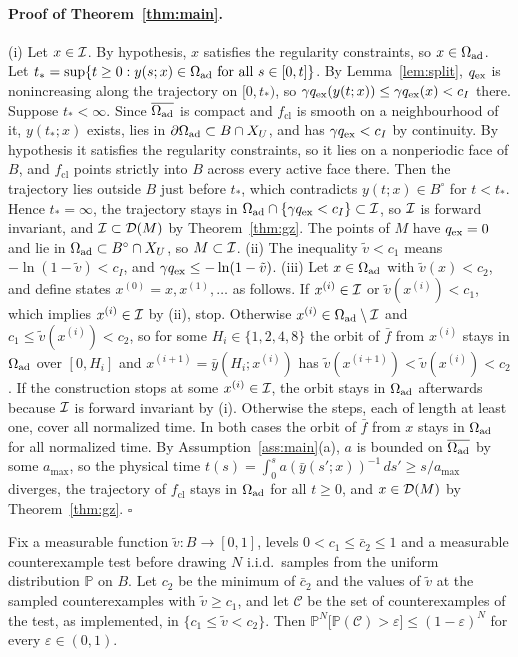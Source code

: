 \paragraph{Proof of Theorem~\ref{thm:main}.} (i) Let $x\in\mathcal I$. By hypothesis, $x$ satisfies the regularity constraints, so $x\in\Omega_{\mathrm{ad}}$. Let $t_*=\sup\{t\ge0:y(s;x)\in\Omega_{\mathrm{ad}}\text{ for all }s\in[0,t]\}$. By Lemma~\ref{lem:split}, $q_{\mathrm{ex}}$ is nonincreasing along the trajectory on $[0,t_*)$, so $\gamma q_{\mathrm{ex}}(y(t;x))\le\gamma q_{\mathrm{ex}}(x)<c_I$ there. Suppose $t_*<\infty$. Since $\overline{\Omega_{\mathrm{ad}}}$ is compact and $f_{\mathrm{cl}}$ is smooth on a neighbourhood of it, $y(t_*;x)$ exists, lies in $\partial\Omega_{\mathrm{ad}}\subset B\cap X_U$, and has $\gamma q_{\mathrm{ex}}<c_I$ by continuity. By hypothesis it satisfies the regularity constraints, so it lies on a nonperiodic face of $B$, and $f_{\mathrm{cl}}$ points strictly into $B$ across every active face there. Then the trajectory lies outside $B$ just before $t_*$, which contradicts $y(t;x)\in B^\circ$ for $t<t_*$. Hence $t_*=\infty$, the trajectory stays in $\Omega_{\mathrm{ad}}\cap\{\gamma q_{\mathrm{ex}}<c_I\}\subset\mathcal I$, so $\mathcal I$ is forward invariant, and $\mathcal I\subset\mathcal D(M)$ by Theorem~\ref{thm:gz}. The points of $M$ have $q_{\mathrm{ex}}=0$ and lie in $\Omega_{\mathrm{ad}}\subset B^\circ\cap X_U$, so $M\subset\mathcal I$. (ii) The inequality $\tilde v<c_1$ means $-\ln(1-\tilde v)<c_I$, and $\gamma q_{\mathrm{ex}}\le-\ln(1-\tilde v)$. (iii) Let $x\in\Omega_{\mathrm{ad}}$ with $\tilde v(x)<c_2$, and define states $x^{(0)}=x,x^{(1)},\dots$ as follows. If $x^{(i)}\in\mathcal I$ or $\tilde v(x^{(i)})<c_1$, which implies $x^{(i)}\in\mathcal I$ by (ii), stop. Otherwise $x^{(i)}\in\Omega_{\mathrm{ad}}\setminus\mathcal I$ and $c_1\le\tilde v(x^{(i)})<c_2$, so for some $H_i\in\{1,2,4,8\}$ the orbit of $\bar f$ from $x^{(i)}$ stays in $\Omega_{\mathrm{ad}}$ over $[0,H_i]$ and $x^{(i+1)}=\bar y(H_i;x^{(i)})$ has $\tilde v(x^{(i+1)})<\tilde v(x^{(i)})<c_2$. If the construction stops at some $x^{(i)}\in\mathcal I$, the orbit stays in $\Omega_{\mathrm{ad}}$ afterwards because $\mathcal I$ is forward invariant by (i). Otherwise the steps, each of length at least one, cover all normalized time. In both cases the orbit of $\bar f$ from $x$ stays in $\Omega_{\mathrm{ad}}$ for all normalized time. By Assumption~\ref{ass:main}(a), $a$ is bounded on $\overline{\Omega_{\mathrm{ad}}}$ by some $a_{\max}$, so the physical time $t(s)=\int_0^s a(\bar y(s';x))^{-1}\,ds'\ge s/a_{\max}$ diverges, the trajectory of $f_{\mathrm{cl}}$ stays in $\Omega_{\mathrm{ad}}$ for all $t\ge0$, and $x\in\mathcal D(M)$ by Theorem~\ref{thm:gz}. \hfill$\square$

\begin{proposition}\label{prop:scen}
Fix a measurable function $\tilde v:B\to[0,1]$, levels $0<c_1\le\bar c_2\le1$ and a measurable counterexample test before drawing $N$ i.i.d.\ samples from the uniform distribution $\mathbb P$ on $B$. Let $c_2$ be the minimum of $\bar c_2$ and the values of $\tilde v$ at the sampled counterexamples with $\tilde v\ge c_1$, and let $\mathcal C$ be the set of counterexamples of the test, as implemented, in $\{c_1\le\tilde v<c_2\}$. Then $\mathbb P^N\big[\mathbb P(\mathcal C)>\varepsilon\big]\le(1-\varepsilon)^N$ for every $\varepsilon\in(0,1)$.
\end{proposition}

